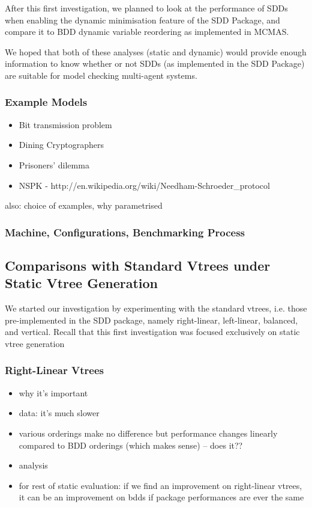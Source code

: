 \documentclass[11pt]{article}
\begin{document}
After this first investigation, we planned to look at the performance of SDDs when enabling the dynamic minimisation feature of the SDD Package, and compare it to BDD dynamic variable reordering as implemented in MCMAS.

We hoped that both of these analyses (static and dynamic) would provide enough information to know whether or not SDDs (as implemented in the SDD Package) are suitable for model checking multi-agent systems.

	\subsubsection{Example Models}
	\label{ispl_examples}
\begin{itemize}
\item Bit transmission problem 
\item Dining Cryptographers
\item Prisoners' dilemma 
\item NSPK - 
http://en.wikipedia.org/wiki/Needham-Schroeder\_protocol
\end{itemize}

also: choice of examples, why parametrised 
\subsubsection{Machine, Configurations, Benchmarking Process} 



\subsection{Comparisons with Standard Vtrees under Static Vtree Generation}

We started our investigation by experimenting with the standard vtrees, i.e. those pre-implemented in the SDD package, namely right-linear, left-linear, balanced, and vertical. Recall that this first investigation was focused exclusively on static vtree generation

\subsubsection{Right-Linear Vtrees} 

\begin{itemize}
\item why it's important
\item data: it's much slower
\item various orderings make no difference but performance changes linearly compared to BDD orderings (which makes sense) -- does it??
\item analysis
\item for rest of static evaluation: if we find an improvement on right-linear vtrees, it can be an improvement on bdds if package performances are ever the same
\end{itemize}
\end{document}
